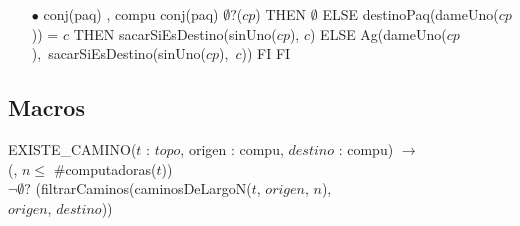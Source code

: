 \begin{itemize}
\item[$\bullet$] {conj(paq) , compu} {conj(paq)} {}
 {\IF $\emptyset?$($cp$)
											 THEN $\emptyset$
											 ELSE {\IF destinoPaq(dameUno($cp$)) = $c$
											 		THEN sacarSiEsDestino(sinUno($cp$), $c$)
											 		ELSE \mbox{Ag(dameUno($cp$), sacarSiEsDestino(sinUno($cp$), $c$))}
											 		FI}
											 FI}
\end{itemize}

\subsection*{Macros}
EXISTE\_CAMINO($t$ : $topo$, origen : compu, $destino$ : compu) $\to$ \\
\hspace*{6em}(, $n \leq$ \#computadoras($t$))\\
\hspace*{8em}$\neg\emptyset?$ (filtrarCaminos(caminosDeLargoN($t$, $origen$, $n$),\\
\hspace*{17em}$origen$, $destino$))

